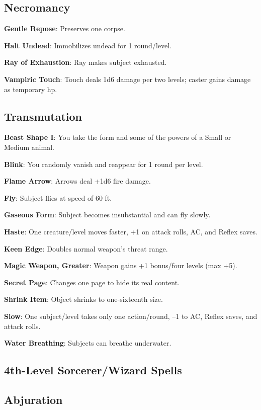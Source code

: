 \subsection{Necromancy}


\textbf{Gentle Repose}: Preserves one corpse.

\textbf{Halt Undead}: Immobilizes undead for 1 round/level.

\textbf{Ray of Exhaustion}: Ray makes subject exhausted.

\textbf{Vampiric Touch}: Touch deals 1d6 damage per two levels; caster gains damage as temporary hp.

\subsection{Transmutation}


\textbf{Beast Shape I}: You take the form and some of the powers of a Small or Medium animal.

\textbf{Blink}: You randomly vanish and reappear for 1 round per level.

\textbf{Flame Arrow}: Arrows deal +1d6 fire damage.

\textbf{Fly}: Subject flies at speed of 60 ft.

\textbf{Gaseous Form}: Subject becomes insubstantial and can fly slowly.

\textbf{Haste}: One creature/level moves faster, +1 on attack rolls, AC, and Reflex saves.

\textbf{Keen Edge}: Doubles normal weapon's threat range.

\textbf{Magic Weapon, Greater}: Weapon gains +1 bonus/four levels (max +5).

\textbf{Secret Page}: Changes one page to hide its real content.

\textbf{Shrink Item}: Object shrinks to one-sixteenth size.

\textbf{Slow}: One subject/level takes only one action/round, --1 to AC, Reflex saves, and attack rolls.

\textbf{Water Breathing}: Subjects can breathe underwater.

\subsection{4th-Level Sorcerer/Wizard Spells}


\subsection{Abjuration}


